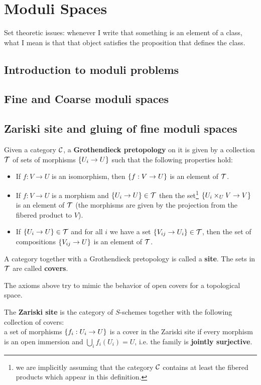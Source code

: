 \chapter{Moduli Spaces}
Set theoretic issues: whenever I write that something is an element of a class, what I mean is that that object satisfies the proposition that defines the class.

\section{Introduction to moduli problems}

\section{Fine and Coarse moduli spaces}

\section{Zariski site and gluing of fine moduli spaces}

\begin{definition}
Given a category $\mathcal{C}$, a \textbf{Grothendieck pretopology} on it is given by a collection $\mathcal{T}$ of sets of morphisms $\left\{{U_i\to U}\right\}$ such that the following properties hold:
\begin{itemize}
\item If $f:V\to U$ is an isomorphism, then $\left\{{f:V\to U}\right\}$ is an element of $\mathcal{T}$.
\item If $f:V\to U$ is a morphism and $\left\{{U_i\to U}\right\}\in \mathcal{T}$ then the set\footnote{we are implicitly assuming that the category $\mathcal{C}$ contains at least the fibered products which appear in this definition.} $\left\{{U_i\times_U V\to V}\right\}$ is an element of $\mathcal{T}$ (the morphisms are given by the projection from the fibered product to $V$).
\item If $\left\{{U_i\to U}\right\}\in \mathcal{T}$ and for all $i$ we have a set $\left\{{V_{ij}\to U_i}\right\}\in \mathcal{T}$, then the set of compositions $\left\{{V_{ij}\to U}\right\}$ is an element of $\mathcal{T}$.
\end{itemize}
A category together with a Grothendieck pretopology is called a \textbf{site}. The sets in $\mathcal{T}$ are called \textbf{covers}.
\end{definition}
\begin{remark}
The axioms above try to mimic the behavior of open covers for a topological space.
\end{remark}
\begin{definition}
The \textbf{Zariski site} is the category of $S$-schemes together with the following collection of covers:\\
a set of morphisms $\left\{{f_i:U_i\to U}\right\}$ is a cover in the Zariski site if every morphism is an open immersion and $\bigcup_i f_i(U_i)=U$, i.e. the family is \textbf{jointly surjective}.
\end{definition}

